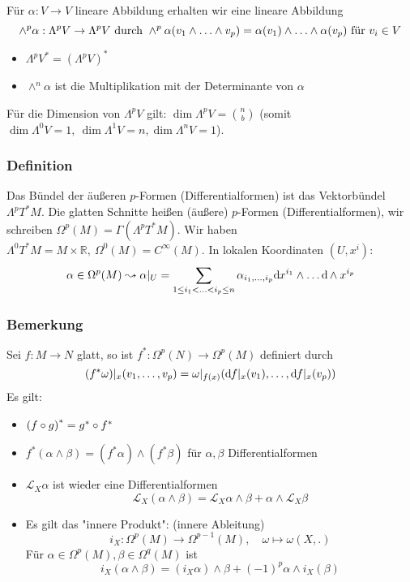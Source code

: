Für $\alpha: V\to V$ lineare Abbildung erhalten wir eine lineare Abbildung
\[
\wedge^p \alpha: \Lambda^p V \to \Lambda^p V\ \text{durch}\ \wedge^p \alpha\enbrace{v_1\wedge \ldots \wedge v_p} = \alpha(v_1)\wedge \ldots \wedge \alpha(v_p)\ \text{für}\ v_i\in V
\]
\begin{itemize}
\item $\Lambda^p V^* = (\Lambda^p V)^*$
\item $\wedge^n \alpha$ ist die Multiplikation mit der Determinante von $\alpha$
\end{itemize}
Für die Dimension von $\Lambda^p V$ gilt: $\dim \Lambda^p V = \binom{n}{b}$ (somit $\dim \Lambda^0 V = 1,\ \dim \Lambda^1 V = n, \dim \Lambda^n V = 1$).

\subsubsection{Definition}
\label{ssub:189}
Das Bündel der äußeren $p$-Formen (Differentialformen) ist das Vektorbündel $\Lambda^p T^* M$. Die glatten Schnitte heißen (äußere) $p$-Formen (Differentialformen), wir schreiben $\Omega^p (M) = \Gamma(\Lambda^p T^* M)$. Wir haben $\Lambda^0 T^* M = M\times \mathds{R},\ \Omega^0(M) = C^\infty (M)$. In lokalen Koordinaten $(U,x^i)$:
\[\alpha \in \Omega^p (M) \leadsto \alpha\vert_U = \sum_{1\leq i_1 < \ldots < i_p \leq n} \alpha_{i_1,\ldots,i_p} \mathd x^{i_1} \wedge \ldots \mathd \wedge x^{i_p}\]

\subsubsection{Bemerkung}
\label{ssub:190}
Sei $f:M\to N$ glatt, so ist $f^*:\Omega^p(N) \to \Omega^p(M)$ definiert durch
\[
(f^* \omega)\vert_x(v_1,\ldots,v_p) = \omega\vert_{f(x)} \enbrace*{\mathd f\vert_{x} (v_1),\ldots, \mathd f\vert_{x} (v_p)}
\]
Es gilt:
\begin{itemize}
\item $\enbrace*{f\circ g}^* = g^* \circ f^*$
\item $f^*(\alpha \wedge \beta) = (f^* \alpha) \wedge (f^* \beta)$ für $\alpha,\beta$ Differentialformen
\item $\mathcal{L}_X \alpha$ ist wieder eine Differentialformen
\[
\mathcal{L}_X (\alpha \wedge \beta) = \mathcal{L}_X \alpha \wedge \beta + \alpha \wedge \mathcal{L}_X \beta
\]
\item Es gilt das "innere Produkt": (innere Ableitung)
\[
i_X:\Omega^p (M)\to \Omega^{p-1} (M),\quad \omega \mapsto \omega (X,.)
\]
Für $\alpha \in \Omega^p (M), \beta \in \Omega^q (M)$ ist 
\[
i_X(\alpha \wedge \beta) = (i_X \alpha)\wedge \beta+ (-1)^p \alpha \wedge i_X(\beta)
\]
\end{itemize}

